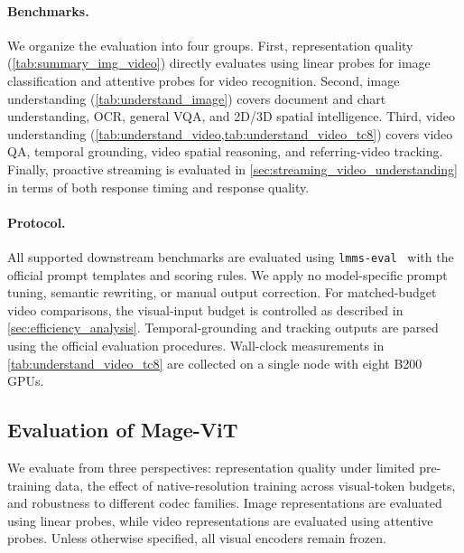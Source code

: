 \paragraph{Benchmarks.}
We organize the evaluation into four groups. First, representation quality (\cref{tab:summary_img_video}) directly evaluates \magevit using linear probes for image classification and attentive probes for video recognition. Second, image understanding (\cref{tab:understand_image}) covers document and chart understanding, OCR, general VQA, and 2D/3D spatial intelligence. Third, video understanding (\cref{tab:understand_video,tab:understand_video_tc8}) covers video QA, temporal grounding, video spatial reasoning, and referring-video tracking. Finally, proactive streaming is evaluated in \cref{sec:streaming_video_understanding} in terms of both response timing and response quality.



\paragraph{Protocol.}
All supported downstream benchmarks are evaluated using \texttt{lmms-eval}~\citep{zhang2025lmms} with the official prompt templates and scoring rules. We apply no model-specific prompt tuning, semantic rewriting, or manual output correction. For matched-budget video comparisons, the visual-input budget is controlled as described in \cref{sec:efficiency_analysis}. Temporal-grounding and tracking outputs are parsed using the official evaluation procedures. Wall-clock measurements in \cref{tab:understand_video_tc8} are collected on a single node with eight B200 GPUs.





    
\subsection{Evaluation of Mage-ViT}
\label{sec:magevit_eval}
We evaluate \magevit from three perspectives: representation quality under limited pre-training data, the effect of native-resolution training across visual-token budgets, and robustness to different codec families. Image representations are evaluated using linear probes, while video representations are evaluated using attentive probes. Unless otherwise specified, all visual encoders remain frozen.






